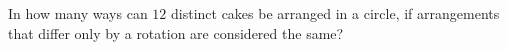 In how many ways can $12$ distinct cakes be arranged in a circle, if arrangements that differ only by a rotation are considered the same?
